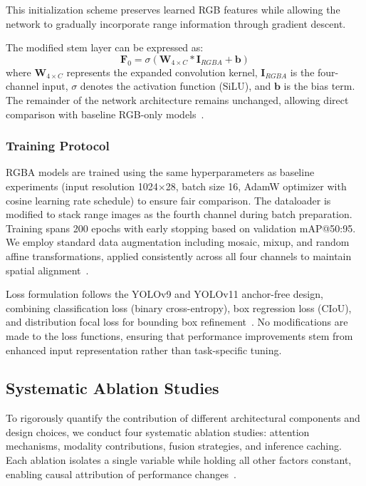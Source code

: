 \documentclass[runningheads]{llncs}
\begin{document}
This initialization scheme preserves learned RGB features while allowing the network to gradually incorporate range information through gradient descent.

The modified stem layer can be expressed as:
\small{
\begin{equation}
\mathbf{F}_0 = \sigma(\mathbf{W}_{4 \times C} * \mathbf{I}_{RGBA} + \mathbf{b})
\end{equation}
}
where $\mathbf{W}_{4 \times C}$ represents the expanded convolution kernel, $\mathbf{I}_{RGBA}$ is the four-channel input, $\sigma$ denotes the activation function (SiLU), and $\mathbf{b}$ is the bias term. The remainder of the network architecture remains unchanged, allowing direct comparison with baseline RGB-only models~\cite{bochkovskiy2020yolov4}.

\subsubsection{Training Protocol}

RGBA models are trained using the same hyperparameters as baseline experiments (input resolution 1024$\times$28, batch size 16, AdamW optimizer with cosine learning rate schedule) to ensure fair comparison. The dataloader is modified to stack range images as the fourth channel during batch preparation. Training spans 200 epochs with early stopping based on validation mAP@50:95. We employ standard data augmentation including mosaic, mixup, and random affine transformations, applied consistently across all four channels to maintain spatial alignment~\cite{ultralytics2025docs}.

Loss formulation follows the YOLOv9 and YOLOv11 anchor-free design, combining classification loss (binary cross-entropy), box regression loss (CIoU), and distribution focal loss for bounding box refinement~\cite{wang2024yolov9,wang2023yolov7}. No modifications are made to the loss functions, ensuring that performance improvements stem from enhanced input representation rather than task-specific tuning.


\subsection{Systematic Ablation Studies}
\label{sec:ablation_studies}

To rigorously quantify the contribution of different architectural components and design choices, we conduct four systematic ablation studies: attention mechanisms, modality contributions, fusion strategies, and inference caching. Each ablation isolates a single variable while holding all other factors constant, enabling causal attribution of performance changes~\cite{bishop2006pattern}.
\end{document}
